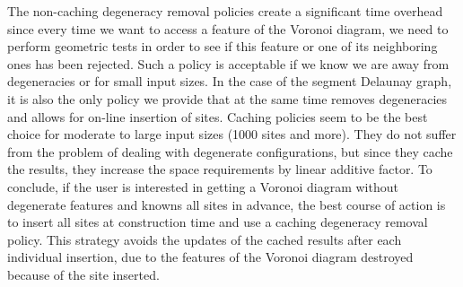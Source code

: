 The non-caching degeneracy removal policies create a significant time
overhead since every time we want to access a feature of the Voronoi
diagram, we need to perform geometric tests in order to see if this
feature or one of its neighboring ones has been rejected.
Such a policy is acceptable if we know we are away from
degeneracies or for small input sizes. In the case of the segment
Delaunay graph, it is also the only policy we provide that at the same
time removes degeneracies and allows for on-line insertion of sites.
Caching policies seem to be the best choice for moderate to large
input sizes (1000 sites and more). They do not suffer from the problem
of dealing with degenerate configurations, but since they cache the
results, they increase the space requirements by linear additive
factor.
%
To conclude, if the user is interested in getting a Voronoi diagram
without degenerate features and knowns all sites in advance, the best course
of action is to insert all sites at construction time and use a caching
degeneracy removal policy. This strategy avoids the updates of the
cached results after each individual insertion, due to the features of
the Voronoi diagram destroyed because of the site inserted.
